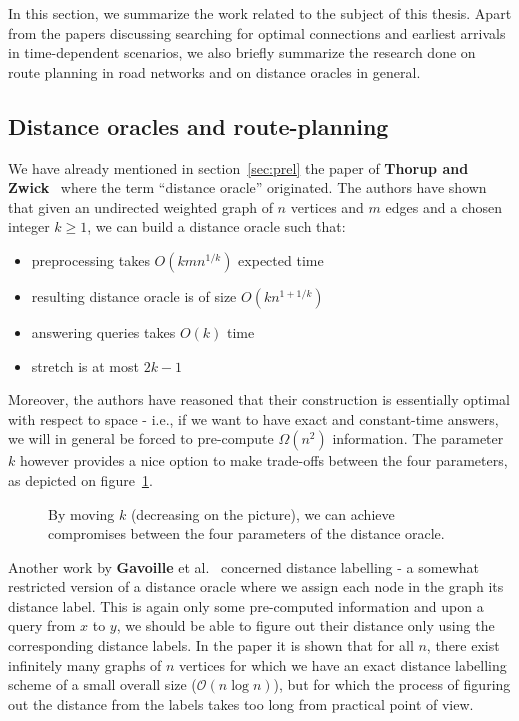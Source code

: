 In this section, we summarize the work related to the subject of this thesis. Apart from the papers discussing searching for optimal connections and earliest arrivals in time-dependent scenarios, we also briefly summarize the research done on route planning in road networks and on distance oracles in general. \\

\subsection{Distance oracles and route-planning}

	\noindent We have already mentioned in section~\ref{sec:prel} the paper of \textbf{Thorup and Zwick}~\cite{apxdo05} where the term ``distance oracle'' originated. The authors have shown that given an undirected weighted graph of $n$ vertices and $m$ edges and a chosen integer $k \geq 1$, we can build a distance oracle such that:
	\begin{itemize}
    	\item preprocessing takes $O(kmn^{1/k})$ expected time
        \item resulting distance oracle is of size $O(kn^{1 + 1/k})$
        \item answering queries takes $O(k)$ time
        \item stretch is at most $2k - 1$ 
	\end{itemize}
	\hspace{\fill}
	
	\noindent Moreover, the authors have reasoned that their construction is essentially optimal with respect to space - i.e., if we want to have exact and constant-time answers, we will in general be forced to pre-compute $\Omega(n^2)$ information. The parameter $k$ however provides a nice option to make trade-offs between the four parameters, as depicted on figure~\ref{fig:compr}.\\
	
	\begin{figure}[h!]
        \begin{center}
        \end{center}
		\caption{\label{fig:compr} By moving $k$ (decreasing on the picture), we can achieve compromises between the four parameters of the distance oracle.}
	\end{figure}
	
	\noindent Another work by \textbf{Gavoille} et al.~\cite{distlabel04} concerned distance labelling - a somewhat restricted version of a distance oracle where we assign each node in the graph its distance label. This is again only some pre-computed information and upon a query from $x$ to $y$, we should be able to figure out their distance only using the corresponding distance labels. In the paper it is shown that for all $n$, there exist infinitely many graphs of $n$ vertices for which we have an exact distance labelling scheme of a small overall size ($\mathcal{O}(n \log n)$), but for which the process of figuring out the distance from the labels takes too long from practical point of view. \\
	
